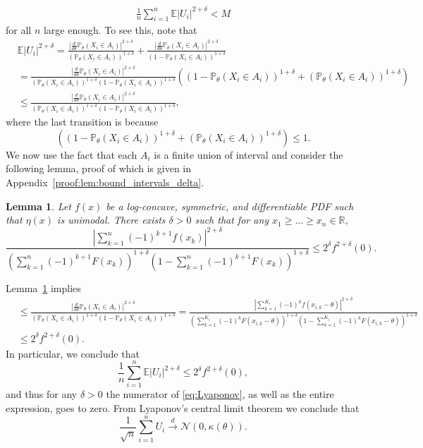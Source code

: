 \documentclass[letterpaper, 11pt]{IEEEtran}      %
\newtheorem{lem}[thm]{\bf {Lemma}}
\newcommand{\Prob}{\mathbb{P} }
\newcommand{\Ncal}{\mathcal{N}}
\begin{document}
\begin{align}
\frac{1}{n} \sum_{i=1}^n \mathbb E  |U_i|^{2+\delta}  < M \label{eq:Lyaponov_num}
\end{align} 
for all $n$ large enough. To see this, note that
\begin{align*}
& \mathbb E |U_i|^{2+\delta} = 
 \frac{ \left| \frac{d}{d\theta} \Prob_{\theta}(X_i \in A_i) \right|^{2+\delta}} {(\Prob_{\theta}(X_i \in A_i))^{1+\delta}} +  
  \frac{ \left|\frac{d}{d\theta} \Prob_{\theta}(X_i \in A_i) \right|^{2+\delta}} {(1-\Prob_{\theta}(X_i \in A_i))^{1+\delta}}  \\
  &  = \frac{\left| \frac{d}{d\theta} \Prob_{\theta}(X_i \in A_i) \right|^{2+\delta} }
  { (\Prob_{\theta}(X_i \in A_i))^{1+\delta} (1-\Prob_{\theta}(X_i \in A_i))^{1+\delta} } 
  \left( (1-\Prob_{\theta}(X_i \in A_i))^{1+\delta} + (\Prob_{\theta}(X_i \in A_i))^{1+\delta}   \right) \\
  &  \leq \frac{\left| \frac{d}{d\theta} \Prob_{\theta}(X_i \in A_i) \right|^{2+\delta} }
  { (\Prob_{\theta}(X_i \in A_i))^{1+\delta} (1-\Prob_{\theta}(X_i \in A_i))^{1+\delta}}, 
\end{align*}
where the last transition is because 
\[
 \left( (1-\Prob_{\theta}(X_i \in A_i))^{1+\delta} + (\Prob_{\theta}(X_i \in A_i))^{1+\delta}   \right) \leq 1. 
\]
We now use the fact that each $A_i$ is a finite union of interval and consider the following lemma, proof of which is given in Appendix~\ref{proof:lem:bound_intervals_delta}.
\begin{lem} \label{lem:bound_intervals_delta}
Let $f(x)$ be a log-concave, symmetric, and differentiable PDF such that $\eta(x)$ is unimodal.  There exists $\delta>0$ such that for any $x_1 \geq \ldots \geq x_n \in \mathbb R$, 
\begin{equation}
\frac{ \left| \sum_{k=1}^n (-1)^{k+1} f(x_k) \right|^{2+\delta} }
{\left( \sum_{k=1}^n (-1)^{k+1} F(x_k) \right)^{1+\delta} \left(1- \sum_{k=1}^n (-1)^{k+1} F(x_k) \right)^{1+\delta} } 
\leq  2^\delta f^{2+\delta}(0). 
\label{eq:lem_bound_intervals_delta}
\end{equation}
\end{lem}

Lemma~\ref{lem:bound_intervals_delta} implies 
\begin{align*}
  &  \leq \frac{\left| \frac{d}{d\theta} \Prob_{\theta}(X_i \in A_i) \right|^{2+\delta} }
  { (\Prob_{\theta}(X_i \in A_i))^{1+\delta} (1-\Prob_{\theta}(X_i \in A_i))^{1+\delta}} = \frac{\left| \sum_{k=1}^{K_i} (-1)^k f(x_{i,k}-\theta) \right|^{2+\delta} }
  { \left( \sum_{k=1}^{K_i} (-1)^k F(x_{i,k}-\theta) \right)^{1+\delta} \left( 1 - \sum_{k=1}^{K_i} (-1)^k F(x_{i,k}-\theta) \right)^{1+\delta}} \\
  & \leq 2^\delta f^{2+\delta}(0). 
\end{align*}
In particular, we conclude that 
\[
\frac{1}{n} \sum_{i=1}^n \mathbb E |U_i|^{2+\delta} \leq 2^\delta f^{2+\delta}(0), 
\]
and thus for any $\delta>0$ the numerator of \eqref{eq:Lyaponov}, as well as the entire expression, goes to zero. From Lyaponov's central limit theorem we conclude that 
\[
\frac{1}{\sqrt{n}} \sum_{i=1}^n U_i \overset{d}{\rightarrow} \Ncal\left(0,\kappa(\theta) \right). 
\]
\end{document}
